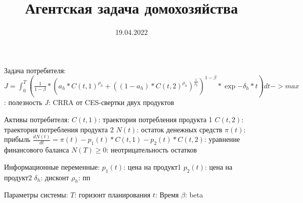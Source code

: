 \documentclass[12pt]{article}
\title{Агентская задача домохозяйства}
\date{19.04.2022}
\begin{document}
Задача потребителя:
    $J = \int_0^T (\frac{1}{1-\beta} * (a_h * C(t, 1)^{\rho_h} + ((1-a_h)*C(t, 2)^{\rho_h})^{\frac{1}{\rho_h}})^{1-\beta} * \exp{-\delta_h*t})dt -> max$: полезность
    $J$: CRRA от CES-свертки двух продуктов

Активы потребителя:
    $C(t, 1)$: траектория потребления продукта 1
    $C(t, 2)$: траектория потребления продукта 2
    $N(t)$: остаток денежных средств
    $\pi(t)$: прибыль
    $\frac{dN(t)}{dt} = \pi(t) - p_{1}(t)*C(t,1) - p_{2}(t)*C(t,2)$: уравнение финансового баланса
    $N(T) \geq 0$: неотрицательность остатков

Информационные переменные:
    $p_{1}(t)$: цена на продукт1
    $p_{2}(t)$: цена на продукт2
    $\delta_h$: дисконт
    $\rho_h$: пп

Параметры системы:
    $T$: горизонт планирования
    $t$: Время
    $\beta$: beta
\end{document}
